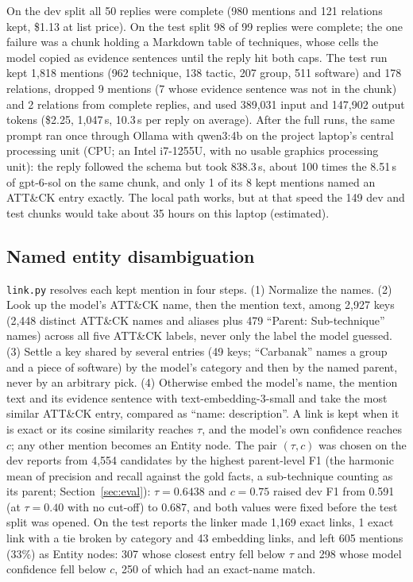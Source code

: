 \documentclass[conference,letterpaper]{IEEEtran}
\newcommand{\code}[1]{\texttt{#1}}
\begin{document}
On the dev split all 50 replies were complete (980 mentions and 121 relations kept, \$1.13 at list price). On the test split 98 of 99 replies were complete; the one failure was a chunk holding a Markdown table of techniques, whose cells the model copied as evidence sentences until the reply hit both caps. The test run kept 1,818 mentions (962 technique, 138 tactic, 207 group, 511 software) and 178 relations, dropped 9 mentions (7 whose evidence sentence was not in the chunk) and 2 relations from complete replies, and used 389,031 input and 147,902 output tokens (\$2.25, 1,047\,s, 10.3\,s per reply on average). After the full runs, the same prompt ran once through Ollama with qwen3:4b on the project laptop's central processing unit (CPU; an Intel i7-1255U, with no usable graphics processing unit): the reply followed the schema but took 838.3\,s, about 100 times the 8.51\,s of gpt-6-sol on the same chunk, and only 1 of its 8 kept mentions named an ATT\&CK entry exactly. The local path works, but at that speed the 149 dev and test chunks would take about 35 hours on this laptop (estimated).

\subsection{Named entity disambiguation}\label{sec:ned}
\code{link.py} resolves each kept mention in four steps. (1) Normalize the names. (2) Look up the model's ATT\&CK name, then the mention text, among 2,927 keys (2,448 distinct ATT\&CK names and aliases plus 479 ``Parent: Sub-technique'' names) across all five ATT\&CK labels, never only the label the model guessed. (3) Settle a key shared by several entries (49 keys; ``Carbanak'' names a group and a piece of software) by the model's category and then by the named parent, never by an arbitrary pick. (4) Otherwise embed the model's name, the mention text and its evidence sentence with text-embedding-3-small and take the most similar ATT\&CK entry, compared as ``name: description''. A link is kept when it is exact or its cosine similarity reaches $\tau$, and the model's own confidence reaches $c$; any other mention becomes an Entity node. The pair $(\tau, c)$ was chosen on the dev reports from 4,554 candidates by the highest parent-level F1 (the harmonic mean of precision and recall against the gold facts, a sub-technique counting as its parent; Section~\ref{sec:eval}): $\tau = 0.6438$ and $c = 0.75$ raised dev F1 from 0.591 (at $\tau = 0.40$ with no cut-off) to 0.687, and both values were fixed before the test split was opened. On the test reports the linker made 1,169 exact links, 1 exact link with a tie broken by category and 43 embedding links, and left 605 mentions (33\%) as Entity nodes: 307 whose closest entry fell below $\tau$ and 298 whose model confidence fell below $c$, 250 of which had an exact-name match.
\end{document}
